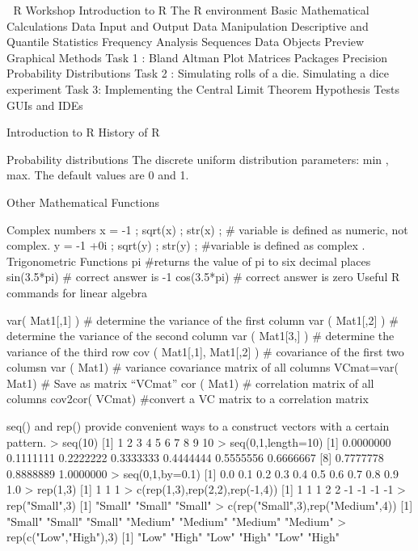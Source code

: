 

R Workshop
Introduction to R
The R environment
Basic Mathematical Calculations
Data Input and Output
Data Manipulation
Descriptive and Quantile Statistics
Frequency Analysis
Sequences
Data Objects
Preview
Graphical Methods
Task 1 : Bland Altman Plot
Matrices
Packages
Precision
Probability Distributions
Task 2 : Simulating rolls of a die.
Simulating a dice experiment
Task 3: Implementing the Central Limit Theorem
Hypothesis Tests
GUIs and  IDEs
 
 
  Introduction to R
History of R



Probability distributions
The discrete uniform distribution
parameters: min , max.
The default values are 0 and 1.

Other Mathematical Functions
 
Complex numbers
x = -1 ;  sqrt(x)  ;  str(x) ;               # variable is defined as numeric, not complex.
y = -1 +0i ;  sqrt(y)  ;  str(y) ;                  #variable is defined as complex .
Trigonometric  Functions
pi                                                        #returns the value of pi to six decimal places
sin(3.5*pi)                                          # correct answer is -1
cos(3.5*pi)                         	             # correct answer is zero
Useful R commands for linear algebra

 
 
var( Mat1[,1] )                                          # determine the variance of the first column
var ( Mat1[,2] )                                          # determine the variance of the second column
var ( Mat1[3,] )                                          # determine the variance of the third row
cov ( Mat1[,1], Mat1[,2] )              # covariance of the first two columsn
var ( Mat1)                                          # variance covariance matrix of all columns
VCmat=var( Mat1)                            # Save as matrix “VCmat”
cor ( Mat1)                                          # correlation matrix of all columns
cov2cor( VCmat)                            #convert a VC matrix to a correlation matrix
 
seq() and rep() provide convenient ways to a construct vectors with a certain pattern. 
> seq(10) 
 [1]  1  2  3  4  5  6  7  8  9 10 
> seq(0,1,length=10) 
 [1] 0.0000000 0.1111111 0.2222222 0.3333333 0.4444444 0.5555556 0.6666667 
 [8] 0.7777778 0.8888889 1.0000000 
> seq(0,1,by=0.1) 
 [1] 0.0 0.1 0.2 0.3 0.4 0.5 0.6 0.7 0.8 0.9 1.0 
> rep(1,3) 
[1] 1 1 1 
> c(rep(1,3),rep(2,2),rep(-1,4)) 
[1]  1  1  1  2  2 -1 -1 -1 -1 
> rep("Small",3) 
[1] "Small" "Small" "Small" 
> c(rep("Small",3),rep("Medium",4)) 
[1] "Small"  "Small"  "Small"  "Medium" "Medium" "Medium" "Medium" 
> rep(c("Low","High"),3) 
[1] "Low"  "High" "Low"  "High" "Low"  "High"

